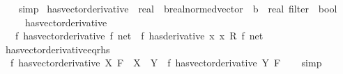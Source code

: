 \begin{isabellebody}
%
\isadelimproof
\ \ %
\endisadelimproof
%
\isatagproof
{}\isamarkupfalse%
\ simp%
\endisatagproof
{\isafoldproof}%
%
\isadelimproof
\isanewline
%
\endisadelimproof
\isanewline
{}\isamarkupfalse%
\ has{\isacharunderscore}{\kern0pt}vector{\isacharunderscore}{\kern0pt}derivative\ {\isacharcolon}{\kern0pt}{\isacharcolon}{\kern0pt}\ {\isachardoublequoteopen}{\isacharparenleft}{\kern0pt}real\ {\isasymRightarrow}\ {\isacharprime}{\kern0pt}b{\isacharcolon}{\kern0pt}{\isacharcolon}{\kern0pt}real{\isacharunderscore}{\kern0pt}normed{\isacharunderscore}{\kern0pt}vector{\isacharparenright}{\kern0pt}\ {\isasymRightarrow}\ {\isacharprime}{\kern0pt}b\ {\isasymRightarrow}\ real\ filter\ {\isasymRightarrow}\ bool{\isachardoublequoteclose}\isanewline
\ \ \ \ {\isacharparenleft}{\kern0pt}\ {\isachardoublequoteopen}has{\isacharprime}{\kern0pt}{\isacharunderscore}{\kern0pt}vector{\isacharprime}{\kern0pt}{\isacharunderscore}{\kern0pt}derivative{\isachardoublequoteclose}\ {}{}{\isacharparenright}{\kern0pt}\isanewline
\ \ \ {\isachardoublequoteopen}{\isacharparenleft}{\kern0pt}f\ has{\isacharunderscore}{\kern0pt}vector{\isacharunderscore}{\kern0pt}derivative\ f{\isacharprime}{\kern0pt}{\isacharparenright}{\kern0pt}\ net\ {\isasymlongleftrightarrow}\ {\isacharparenleft}{\kern0pt}f\ has{\isacharunderscore}{\kern0pt}derivative\ {\isacharparenleft}{\kern0pt}{\isasymlambda}x{\isachardot}{\kern0pt}\ x\ {\isacharasterisk}{\kern0pt}\isactrlsub R\ f{\isacharprime}{\kern0pt}{\isacharparenright}{\kern0pt}{\isacharparenright}{\kern0pt}\ net{\isachardoublequoteclose}\isanewline
\isanewline
{}\isamarkupfalse%
\ has{\isacharunderscore}{\kern0pt}vector{\isacharunderscore}{\kern0pt}derivative{\isacharunderscore}{\kern0pt}eq{\isacharunderscore}{\kern0pt}rhs{\isacharcolon}{\kern0pt}\isanewline
\ \ {\isachardoublequoteopen}{\isacharparenleft}{\kern0pt}f\ has{\isacharunderscore}{\kern0pt}vector{\isacharunderscore}{\kern0pt}derivative\ X{\isacharparenright}{\kern0pt}\ F\ {\isasymLongrightarrow}\ X\ {\isacharequal}{\kern0pt}\ Y\ {\isasymLongrightarrow}\ {\isacharparenleft}{\kern0pt}f\ has{\isacharunderscore}{\kern0pt}vector{\isacharunderscore}{\kern0pt}derivative\ Y{\isacharparenright}{\kern0pt}\ F{\isachardoublequoteclose}\isanewline
%
\isadelimproof
\ \ %
\endisadelimproof
%
\isatagproof
{}\isamarkupfalse%
\ simp%
\endisatagproof
{\isafoldproof}%
%
\isadelimproof
\isanewline
%
\endisadelimproof
\isanewline
{}\isamarkupfalse%

\end{isabellebody}
